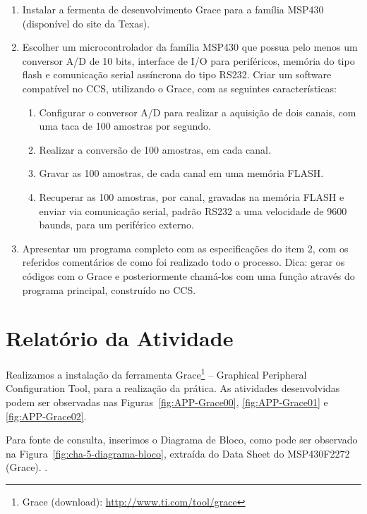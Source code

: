 \documentclass[
	12pt,				%
	openright,			%
  oneside,     %
	a4paper,			%
	english,			%
	french,				%
	spanish,			%
	brazil				%
	]{abntex2}
\begin{document}
\begin{enumerate}
  \item Instalar a fermenta de desenvolvimento Grace para a família MSP430 (disponível do site da Texas).
  \item Escolher um microcontrolador da família MSP430 que possua pelo menos um conversor A/D de 10 bits, interface de I/O para periféricos, memória do tipo flash e comunicação serial assíncrona do tipo RS232. Criar um software compatível no CCS, utilizando o Grace, com as seguintes características:
  \begin{enumerate}
    \item Configurar o conversor A/D para realizar a aquisição de dois canais, com uma taca de 100 amostras por segundo.
    \item Realizar a conversão de 100 amostras, em cada canal.
    \item Gravar as 100 amostras, de cada canal em uma memória FLASH.
    \item Recuperar as 100 amostras, por canal, gravadas na memória FLASH e enviar via comunicação serial, padrão RS232 a uma velocidade de 9600 baunds, para um periférico externo.
  \end{enumerate}
  \item Apresentar um programa completo com as especificações do item 2, com os referidos comentários de como foi realizado todo o processo. Dica: gerar os códigos com o Grace e posteriormente chamá-los com uma função através do programa principal, construído no CCS.
\end{enumerate}


\section{Relatório da Atividade} %
\label{sec:msp430_grace-consideracoes}

Realizamos a instalação da ferramenta Grace\footnote{Grace (download): \url{http://www.ti.com/tool/grace}} -- Graphical Peripheral Configuration Tool, para a realização da prática. As atividades desenvolvidas podem ser observadas nas Figuras~\ref{fig:APP-Grace00}, \ref{fig:APP-Grace01} e \ref{fig:APP-Grace02}.

Para fonte de consulta, inserimos o Diagrama de Bloco, como pode ser observado na Figura~\ref{fig:cha-5-diagrama-bloco}, extraída do Data Sheet do MSP430F2272 (Grace). \cite{Instruments2012}.
\end{document}
